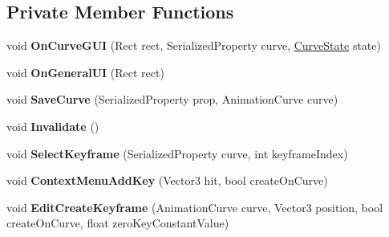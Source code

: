 \subsection*{Private Member Functions}
\begin{DoxyCompactItemize}
\item 
\mbox{\label{class_unity_editor_1_1_post_processing_1_1_curve_editor_a39f9acccbbcd196c0b19866c32c35cb2}} 
void {\bfseries On\+Curve\+G\+UI} (Rect rect, Serialized\+Property curve, \hyperlink{struct_unity_editor_1_1_post_processing_1_1_curve_editor_1_1_curve_state}{Curve\+State} state)
\item 
\mbox{\label{class_unity_editor_1_1_post_processing_1_1_curve_editor_a51d3b4c9245596b4e4d515130a8575bb}} 
void {\bfseries On\+General\+UI} (Rect rect)
\item 
\mbox{\label{class_unity_editor_1_1_post_processing_1_1_curve_editor_ab5be794aa2fa17ea16ed33e67a5bbb2f}} 
void {\bfseries Save\+Curve} (Serialized\+Property prop, Animation\+Curve curve)
\item 
\mbox{\label{class_unity_editor_1_1_post_processing_1_1_curve_editor_a4d0f5edafeb168196555b2e4e0293622}} 
void {\bfseries Invalidate} ()
\item 
\mbox{\label{class_unity_editor_1_1_post_processing_1_1_curve_editor_aa2f6bae1e5c4cbc62ecf30d3ae2c32b8}} 
void {\bfseries Select\+Keyframe} (Serialized\+Property curve, int keyframe\+Index)
\item 
\mbox{\label{class_unity_editor_1_1_post_processing_1_1_curve_editor_a187c3f1c4c970132ed866aaf85d18af5}} 
void {\bfseries Context\+Menu\+Add\+Key} (Vector3 hit, bool create\+On\+Curve)
\item 
\mbox{\label{class_unity_editor_1_1_post_processing_1_1_curve_editor_ac7bf9cc7c1d86208b30bd5252281a472}} 
void {\bfseries Edit\+Create\+Keyframe} (Animation\+Curve curve, Vector3 position, bool create\+On\+Curve, float zero\+Key\+Constant\+Value)

\end{DoxyCompactItemize}
